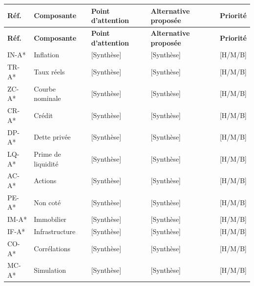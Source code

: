 \documentclass[11pt,a4paper]{article}
\newcommand{\tablehead}[1]{\textcolor{nxnavy}{\sffamily\bfseries\small #1}}
\newcommand{\tabcaption}[1]{\par\vspace{2pt}{\centering\footnotesize\textcolor{nxgray}{\itshape #1}\par}\vspace{8pt}}
\begin{document}
\begin{longtable}{P{1.2cm}P{2.2cm}P{4.2cm}P{4.2cm}P{1.4cm}}
\toprule
\tablehead{Réf.} & \tablehead{Composante} & \tablehead{Point d'attention} & \tablehead{Alternative proposée} & \tablehead{Priorité} \\
\midrule\endfirsthead
\toprule
\tablehead{Réf.} & \tablehead{Composante} & \tablehead{Point d'attention} & \tablehead{Alternative proposée} & \tablehead{Priorité} \\
\midrule\endhead
\bottomrule\endfoot
{\small IN-A*} & {\small Inflation} & {\small [Synthèse]} & {\small [Synthèse]} & {\small [H/M/B]} \\
{\small TR-A*} & {\small Taux réels} & {\small [Synthèse]} & {\small [Synthèse]} & {\small [H/M/B]} \\
{\small ZC-A*} & {\small Courbe nominale} & {\small [Synthèse]} & {\small [Synthèse]} & {\small [H/M/B]} \\
{\small CR-A*} & {\small Crédit} & {\small [Synthèse]} & {\small [Synthèse]} & {\small [H/M/B]} \\
{\small DP-A*} & {\small Dette privée} & {\small [Synthèse]} & {\small [Synthèse]} & {\small [H/M/B]} \\
{\small LQ-A*} & {\small Prime de liquidité} & {\small [Synthèse]} & {\small [Synthèse]} & {\small [H/M/B]} \\
{\small AC-A*} & {\small Actions} & {\small [Synthèse]} & {\small [Synthèse]} & {\small [H/M/B]} \\
{\small PE-A*} & {\small Non coté} & {\small [Synthèse]} & {\small [Synthèse]} & {\small [H/M/B]} \\
{\small IM-A*} & {\small Immobilier} & {\small [Synthèse]} & {\small [Synthèse]} & {\small [H/M/B]} \\
{\small IF-A*} & {\small Infrastructure} & {\small [Synthèse]} & {\small [Synthèse]} & {\small [H/M/B]} \\
{\small CO-A*} & {\small Corrélations} & {\small [Synthèse]} & {\small [Synthèse]} & {\small [H/M/B]} \\
{\small MC-A*} & {\small Simulation} & {\small [Synthèse]} & {\small [Synthèse]} & {\small [H/M/B]} \\
\end{longtable}
\vspace{-10pt}
\tabcaption{Registre consolidé des points d'attention (Axe 3)}
\end{document}

